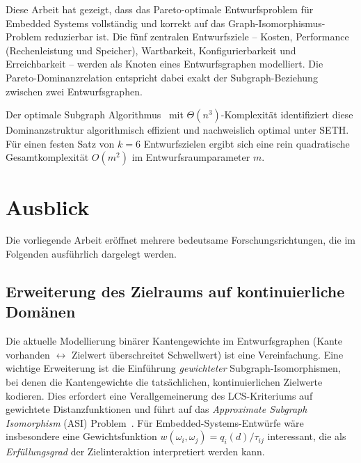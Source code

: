 ﻿\documentclass[a4paper,12pt]{article}
\theoremstyle{definition}
\begin{document}
Diese Arbeit hat gezeigt, dass das Pareto-optimale Entwurfsproblem f\"{u}r
Embedded Systems vollst\"{a}ndig und korrekt auf das Graph-Isomorphismus-Problem
reduzierbar ist. Die f\"{u}nf zentralen Entwurfsziele -- Kosten, Performance
(Rechenleistung und Speicher), Wartbarkeit, Konfigurierbarkeit und
Erreichbarkeit -- werden als Knoten eines Entwurfsgraphen modelliert.
Die Pareto-Dominanzrelation entspricht dabei exakt der Subgraph-Beziehung
zwischen zwei Entwurfsgraphen.

Der optimale Subgraph Algorithmus~\cite{epp2026subgraph} mit
$\Theta(n^3)$-Komplexit\"{a}t identifiziert diese Dominanzstruktur
algorithmisch effizient und nachweislich optimal unter SETH.
F\"{u}r einen festen Satz von $k = 6$ Entwurfszielen ergibt sich
eine rein quadratische Gesamtkomplexit\"{a}t $O(m^2)$ im Entwurfsraumparameter $m$.

\section{Ausblick}

Die vorliegende Arbeit er\"{o}ffnet mehrere bedeutsame Forschungsrichtungen,
die im Folgenden ausf\"{u}hrlich dargelegt werden.

\subsection{Erweiterung des Zielraums auf kontinuierliche Dom\"{a}nen}

Die aktuelle Modellierung bin\"{a}rer Kantengewichte im Entwurfsgraphen
(Kante vorhanden $\leftrightarrow$ Zielwert \"{u}berschreitet Schwellwert) ist
eine Vereinfachung. Eine wichtige Erweiterung ist die Einf\"{u}hrung
\emph{gewichteter} Subgraph-Isomorphismen, bei denen die Kantengewichte die
tats\"{a}chlichen, kontinuierlichen Zielwerte kodieren.
Dies erfordert eine Verallgemeinerung des LCS-Kriteriums auf gewichtete
Distanzfunktionen und f\"{u}hrt auf das \emph{Approximate Subgraph Isomorphism}
(ASI) Problem~\cite{bunke1998graph}.
F\"{u}r Embedded-Systems-Entw\"{u}rfe w\"{a}re insbesondere eine Gewichtsfunktion
$w(\omega_i, \omega_j) = q_i(d) / \tau_{ij}$ interessant, die als
\emph{Erf\"{u}llungsgrad} der Zielinteraktion interpretiert werden kann.
\end{document}
